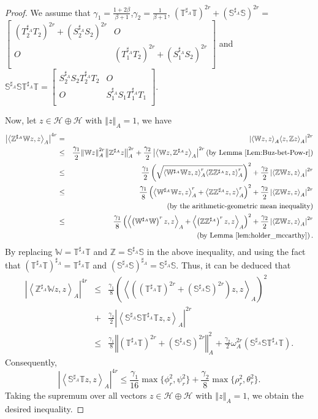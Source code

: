 \documentclass{article}
\newcommand{\bra}[1]{\left(#1\right)}
\newcommand{\seqA}[1]{{\left<#1\right>}_{A}}
\newcommand{\normA}[1]{{\left\Vert#1\right\Vert}_{A}}
\newcommand{\abs}[1]{\left\vert#1\right\vert}
\newcommand{\hh}{\mathcal{H}\oplus\mathcal{H}}
\newcommand {\W}{\mathbb{W}}
\newcommand {\Wa}{\mathbb{W}^{\sharp_{A}}}
\newcommand {\Z}{\mathbb{Z}}
\newcommand {\Za}{\mathbb{Z}^{\sharp_{A}}}
\newcommand {\T}{\mathbb{T}}
\renewcommand {\S}{\mathbb{S}}
\newcommand {\Ta}{\mathbb{T}^{\sharp_{A}}}
\newcommand {\Sa}{\mathbb{S}^{\sharp_{A}}}
\newcommand {\Toa}{T_{1}^{\sharp_{A}}}
\newcommand {\Soa}{S_{1}^{\sharp_{A}}}
\newcommand {\Tta}{T_{2}^{\sharp_{A}}}
\newcommand {\Sta}{S_{2}^{\sharp_{A}}}
\begin{document}
 \begin{proof} We assume that $\gamma_1=\frac{1+2\beta}{\beta+1}$,$\gamma_2=\frac{1}{\beta+1}$,
 $(\Ta\T)^{2r}+(\Sa\S)^{2r}=$ \\$\begin{bmatrix} \bra{\Tta T_2}^{2r}+\bra{\Sta S_2}^{2r}& O\\ O&
 \bra{\Toa T_2}^{2r}+\bra{\Soa S_2}^{2r} \\\end{bmatrix}$
  and $\Sa \S\Ta\T=\begin{bmatrix}\Sta S_2\Tta T_2& O\\ O& \Soa S_1\Toa T_1 \\\end{bmatrix}$.

 Now, let $z\in\hh$ with $\normA{z}=1$, we have
 \begin{eqnarray*}
   \abs{\seqA{\Za\W z,z}}^{4r} &=&\abs{\seqA{\W z,z}\seqA{z,\Z z}}^{2r} \\
    &\leq& \frac{\gamma_1}{2}\normA{\W z}^{2r}\normA{\Za z}^{2r}+\frac{\gamma_2}{2}\abs{\seqA{\W z,\Za z}}^{2r}\bra{\mbox{by Lemma \ref{Lem:Buz-bet-Pow-r}}}\\
    &\leq&\frac{\gamma_1}{2}\bra{\sqrt{\seqA{\Wa\W z,z}^{r}\seqA{\Z\Za z,z}^{r}}}^{2}+
    \frac{\gamma_2}{2}\abs{\seqA{\Z\W z, z}}^{2r}\\
    &\leq&\frac{\gamma_1}{8}\bra{\seqA{\Wa\W z,z}^{r}+\seqA{\Z\Za z,z}^{r}}^2+\frac{\gamma_2}{2}\abs{\seqA{\Z\W z, z}}^{2r}\\
    &&\bra{\mbox{by the arithmetic-geometric mean inequality}}\\
    &\leq& \frac{\gamma_1}{8}\bra{\seqA{\bra{\Wa\W}^{r} z,z}+\seqA{\bra{\Z\Za}^{r} z,z}}^2+\frac{\gamma_2}{2}\abs{\seqA{\Z\W z, z}}^{2r}\\
    &&\bra{\mbox{by Lemma \ref{lem:holder_mccarthy}}}.
 \end{eqnarray*}
 By replacing $\W=\Ta \T$ and $\Z=\Sa \S$ in the above inequality, and using the fact that $\bra{\Ta \T}^{\sharp_A}=\Ta\T$ and
 $\bra{\Sa\S}^{\sharp_A}=\Sa\S$. Thus, it can be deduced that
  \begin{eqnarray*}
    \abs{\seqA{\Za\W z,z}}^{4r}&\leq&  \frac{\gamma_1}{8}\bra{\seqA{\bra{\bra{\Ta\T}^{2r}+\bra{\Sa\S}^{2r}} z,z}}^2\\
     &+&\frac{\gamma_2}{2}\abs{\seqA{\Sa\S\Ta\T z, z}}^{2r}\\
    &\leq&\frac{\gamma_1}{8}\normA{\bra{\Ta\T}^{2r}+\bra{\Sa\S}^{2r}}^2+ \frac{\gamma_2}{2}\omega_A^{2r}\bra{\Sa\S\Ta\T}.
  \end{eqnarray*}
Consequently,
    $$\abs{\seqA{\Sa\T z,z}}^{4r} \leq \frac{\gamma_1}{16}\max\{\phi_r^2,\psi_r^2\}+\frac{\gamma_2}{8}
  \max\{\rho_r^2,\theta_r^2\}.$$
  Taking the supremum over all vectors $z\in\hh$ with $\normA{z}=1$, we obtain the desired inequality.
  \end{proof}
\end{document}
